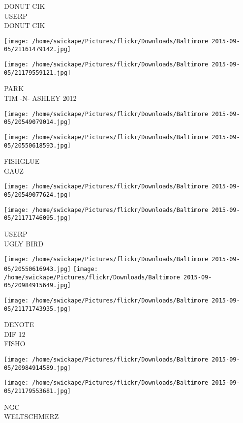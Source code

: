 \documentclass[10pt,letterpaper]{article}
\begin{document}
DONUT CIK\\
USERP\\
DONUT CIK
\pagebreak

\texttt{[image: /home/swickape/Pictures/flickr/Downloads/Baltimore 2015-09-05/21161479142.jpg]}

\vspace{0.25in}
\texttt{[image: /home/swickape/Pictures/flickr/Downloads/Baltimore 2015-09-05/21179559121.jpg]}

PARK\\
TIM {-}N{-} ASHLEY 2012
\pagebreak

\texttt{[image: /home/swickape/Pictures/flickr/Downloads/Baltimore 2015-09-05/20549079014.jpg]}

\vspace{0.25in}
\texttt{[image: /home/swickape/Pictures/flickr/Downloads/Baltimore 2015-09-05/20550618593.jpg]}

FISHGLUE\\
GAUZ
\pagebreak

\texttt{[image: /home/swickape/Pictures/flickr/Downloads/Baltimore 2015-09-05/20549077624.jpg]}

\vspace{0.25in}
\texttt{[image: /home/swickape/Pictures/flickr/Downloads/Baltimore 2015-09-05/21171746095.jpg]}

USERP\\
UGLY BIRD
\pagebreak

\texttt{[image: /home/swickape/Pictures/flickr/Downloads/Baltimore 2015-09-05/20550616943.jpg]}
\texttt{[image: /home/swickape/Pictures/flickr/Downloads/Baltimore 2015-09-05/20984915649.jpg]}

\texttt{[image: /home/swickape/Pictures/flickr/Downloads/Baltimore 2015-09-05/21171743935.jpg]}

DENOTE\\
DIF 12\\
FISHO
\pagebreak

\texttt{[image: /home/swickape/Pictures/flickr/Downloads/Baltimore 2015-09-05/20984914589.jpg]}

\vspace{0.25in}
\texttt{[image: /home/swickape/Pictures/flickr/Downloads/Baltimore 2015-09-05/21179553681.jpg]}

NGC\\
WELTSCHMERZ
\pagebreak
\end{document}
